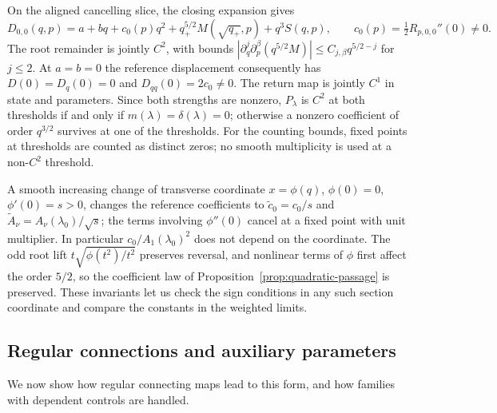 On the aligned cancelling slice, the closing expansion gives
\begin{equation}\label{eq:center-displacement}
 D_{0,0}(q,p)=a+bq+c_0(p)q^2
       +q_+^{5/2}M(\sqrt{q_+},p)+q^3S(q,p),
 \qquad c_0(p)=\tfrac12R_{p,0,0}''(0)\ne0.
\end{equation}
The root remainder is jointly $C^2$, with bounds
$|\partial_q^j\partial_p^\beta(q^{5/2}M)|\le C_{j,\beta}q^{5/2-j}$
for $j\le2$. At $a=b=0$ the reference displacement consequently has
$D(0)=D_q(0)=0$ and $D_{qq}(0)=2c_0\ne0$.
The return map is jointly $C^1$ in state and parameters. Since both strengths
are nonzero, $P_\lambda$ is $C^2$ at both thresholds if and only if
$m(\lambda)=\delta(\lambda)=0$; otherwise a nonzero coefficient of order
$q^{3/2}$ survives at one of the thresholds. For the counting bounds, fixed points at thresholds are counted as distinct
zeros; no smooth multiplicity is used at a non-$C^2$ threshold.

A smooth increasing change of transverse coordinate $x=\phi(q)$, $\phi(0)=0$,
$\phi'(0)=s>0$, changes the reference coefficients to $\widetilde c_0=c_0/s$
and $\widetilde A_\nu=A_\nu(\lambda_0)/\sqrt{s}$; the terms involving $\phi''(0)$
cancel at a fixed point with unit multiplier. In particular $c_0/A_1(\lambda_0)^2$
does not depend on the coordinate. The odd root lift $t\sqrt{\phi(t^2)/t^2}$
preserves reversal, and nonlinear terms of $\phi$ first affect the order
$5/2$, so the coefficient law of Proposition~\ref{prop:quadratic-passage} is
preserved. These invariants let us check the sign conditions in any such
section coordinate and compare the constants in the weighted limits.

\subsection{Regular connections and auxiliary parameters}

We now show how regular connecting maps lead to this form, and how families
with dependent controls are handled.

